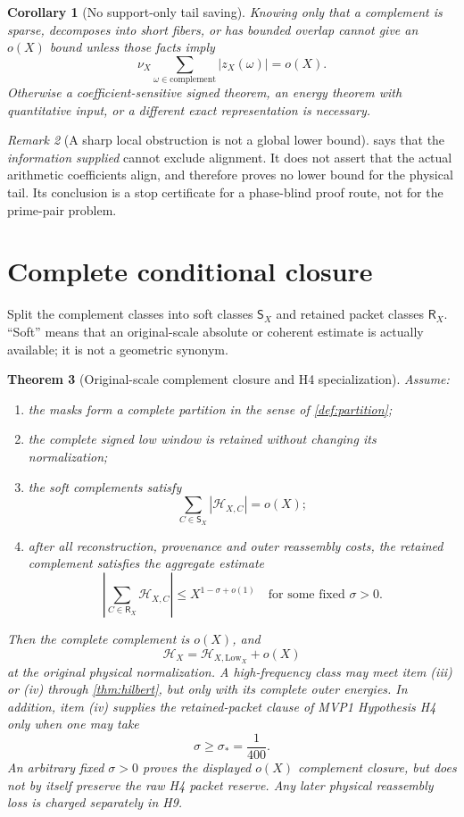 \documentclass[11pt]{article}
\newtheorem{theorem}{Theorem}[section]
\newtheorem{corollary}[theorem]{Corollary}
\theoremstyle{definition}
\theoremstyle{remark}
\newtheorem{remark}[theorem]{Remark}
\newcommand{\Soft}{\mathsf S}
\newcommand{\Ret}{\mathsf R}
\newcommand{\Low}{\mathrm{Low}}
\begin{document}
\begin{corollary}[No support-only tail saving]
\label{cor:no-support}
Knowing only that a complement is sparse, decomposes into short
fibers, or has bounded overlap cannot give an \(o(X)\) bound unless
those facts imply
\[
 \nu_X\sum_{\omega\in\mathrm{complement}}|z_X(\omega)|=o(X).
\]
Otherwise a coefficient-sensitive signed theorem, an energy theorem
with quantitative input, or a different exact representation is
necessary.
\end{corollary}

\begin{remark}[A sharp local obstruction is not a global lower bound]
 says that the \emph{information supplied} cannot
exclude alignment.  It does not assert that the actual arithmetic
coefficients align, and therefore proves no lower bound for the
physical tail.  Its conclusion is a stop certificate for a
phase-blind proof route, not for the prime-pair problem.
\end{remark}

\section{Complete conditional closure}

Split the complement classes into soft classes \(\Soft_X\) and
retained packet classes \(\Ret_X\).  ``Soft'' means that an
original-scale absolute or coherent estimate is actually available;
it is not a geometric synonym.

\begin{theorem}[Original-scale complement closure and H4 specialization]
\label{thm:closure}
Assume:
\begin{enumerate}[label=(\roman*),leftmargin=2.2em]
\item the masks form a complete partition in the sense of
  \cref{def:partition};
\item the complete signed low window is retained without changing
  its normalization;
\item the soft complements satisfy
  \[
  \sum_{C\in\Soft_X}|\mathcal H_{X,C}|=o(X);
  \]
\item after all reconstruction, provenance and outer reassembly
  costs, the retained complement satisfies the \emph{aggregate}
  estimate
  \[
  \left|\sum_{C\in\Ret_X}\mathcal H_{X,C}\right|
  \le X^{1-\sigma+o(1)}
  \quad\text{for some fixed }\sigma>0.
  \]
\end{enumerate}
Then the complete complement is \(o(X)\), and
\[
 \mathcal H_X=\mathcal H_{X,\Low_X}+o(X)
\]
at the original physical normalization.  A high-frequency class may
meet item (iii) or (iv) through \cref{thm:hilbert}, but only with its
complete outer energies.  In addition, item (iv) supplies the
retained-packet clause of MVP1 Hypothesis H4 only when one may take
\[
 \sigma\ge \sigma_*=\frac1{400}.
\]
An arbitrary fixed \(\sigma>0\) proves the displayed \(o(X)\)
complement closure, but does not by itself preserve the raw H4 packet
reserve.  Any later physical reassembly loss is charged separately in
H9.
\end{theorem}
\end{document}
